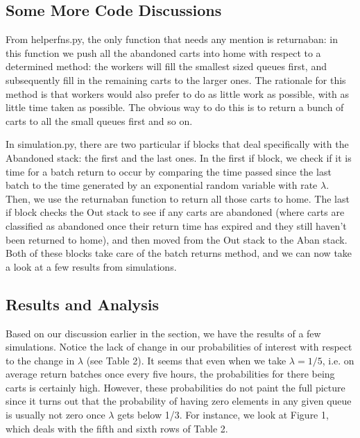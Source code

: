 \documentclass[english]{article}
\begin{document}
\subsection*{Some More Code Discussions}
From helperfns.py, the only function that needs any mention is returnaban: in this function we push all the abandoned carts into home with respect to a determined method: the workers will fill the smallest sized queues first, and subsequently fill in the remaining carts to the larger ones. The rationale for this method is that workers would also prefer to do as little work as possible, with as little time taken as possible. The obvious way to do this is to return a bunch of carts to all the small queues first and so on. 

In simulation.py, there are two particular if blocks that deal specifically with the Abandoned stack: the first and the last ones. In the first if block, we check if it is time for a batch return to occur by comparing the time passed since the last batch to the time generated by an exponential random variable with rate $\lambda$. Then, we use the returnaban function to return all those carts to home. The last if block checks the Out stack to see if any carts are abandoned (where carts are classified as abandoned once their return time has expired and they still haven't been returned to home), and then moved from the Out stack to the Aban stack. Both of these blocks take care of the batch returns method, and we can now take a look at a few results from simulations.

\subsection*{Results and Analysis}

Based on our discussion earlier in the section, we have the results of a few simulations. Notice the lack of change in our probabilities of interest with respect to the change in $\lambda$ (see Table 2). It seems that even when we take $\lambda=1/5$, i.e. on average return batches once every five hours, the probabilities for there being carts is certainly high. However, these probabilities do not paint the full picture since it turns out that the probability of having zero elements in any given queue is usually not zero once $\lambda$ gets below 1/3. For instance, we look at Figure 1, which deals with the fifth and sixth rows of Table 2.
\end{document}
